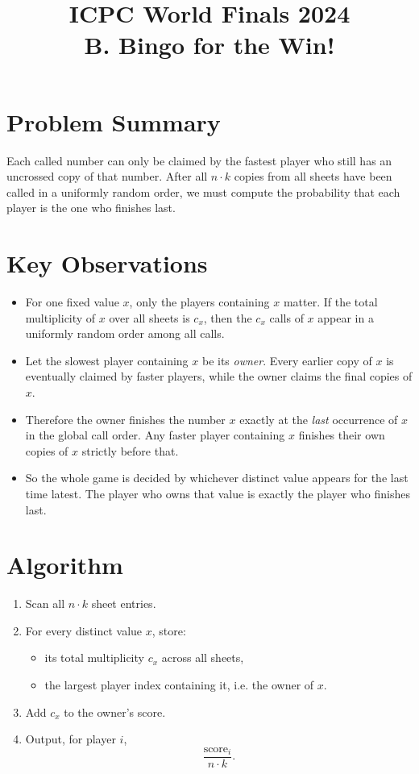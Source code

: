 \documentclass[11pt]{article}
\title{ICPC World Finals 2024\\B. Bingo for the Win!}
\author{}
\date{}
\begin{document}
\maketitle

\section*{Problem Summary}

Each called number can only be claimed by the fastest player who still has an uncrossed copy of that
number. After all $n \cdot k$ copies from all sheets have been called in a uniformly random order, we must
compute the probability that each player is the one who finishes last.

\section*{Key Observations}

\begin{itemize}[leftmargin=*]
    \item For one fixed value $x$, only the players containing $x$ matter. If the total multiplicity of $x$
    over all sheets is $c_x$, then the $c_x$ calls of $x$ appear in a uniformly random order among all calls.
    \item Let the slowest player containing $x$ be its \emph{owner}. Every earlier copy of $x$ is eventually
    claimed by faster players, while the owner claims the final copies of $x$.
    \item Therefore the owner finishes the number $x$ exactly at the \emph{last} occurrence of $x$ in the
    global call order. Any faster player containing $x$ finishes their own copies of $x$ strictly before that.
    \item So the whole game is decided by whichever distinct value appears for the last time latest. The
    player who owns that value is exactly the player who finishes last.
\end{itemize}

\section*{Algorithm}

\begin{enumerate}[leftmargin=*]
    \item Scan all $n \cdot k$ sheet entries.
    \item For every distinct value $x$, store:
    \begin{itemize}[leftmargin=*]
        \item its total multiplicity $c_x$ across all sheets,
        \item the largest player index containing it, i.e. the owner of $x$.
    \end{itemize}
    \item Add $c_x$ to the owner's score.
    \item Output, for player $i$,
    \[
        \frac{\text{score}_i}{n \cdot k}.
    \]
\end{enumerate}
\end{document}
